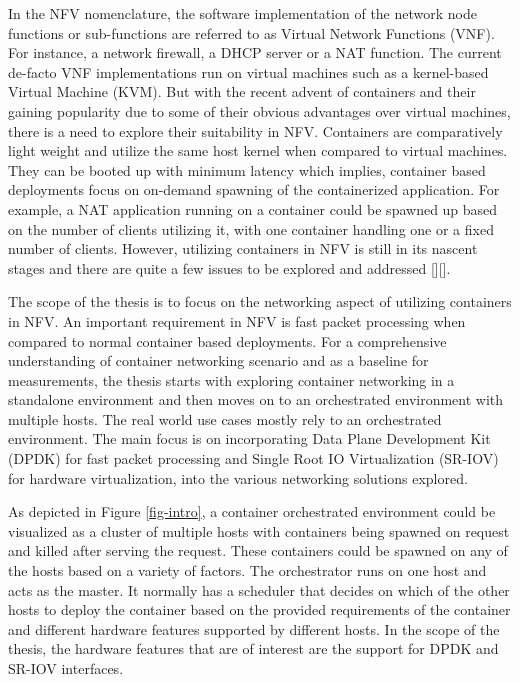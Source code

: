 \documentclass[english, 12pt, a4paper, elec, utf8, a-1b, online]{aaltothesis}
\begin{document}
In the NFV nomenclature, the software implementation of the network node functions or sub-functions are referred to as Virtual Network Functions (VNF). For instance, a network firewall, a DHCP server or a NAT function. The current de-facto VNF implementations run on virtual machines such as a kernel-based Virtual Machine (KVM). But with the recent advent of containers and their gaining popularity due to some of their obvious advantages over virtual machines, there is a need to explore their suitability in NFV. Containers are comparatively light weight and utilize the same host kernel when compared to virtual machines. They can be booted up with minimum latency\cite{container-vm-comparison} which implies, container based deployments focus on on-demand spawning of the containerized application. For example, a NAT application running on a container could be spawned up based on the number of clients utilizing it, with one container handling one or a fixed number of clients. However, utilizing containers in NFV is still in its nascent stages and there are quite a few issues to be explored and addressed [][].

The scope of the thesis is to focus on the networking aspect of utilizing containers in NFV. An important requirement in NFV is fast packet processing when compared to normal container based deployments. For a comprehensive understanding of container networking scenario and as a baseline for measurements, the thesis starts with exploring container networking in a standalone environment and then moves on to an orchestrated environment with multiple hosts. The real world use cases mostly rely to an orchestrated environment. The main focus is on incorporating Data Plane Development Kit (DPDK) for fast packet processing and Single Root IO Virtualization (SR-IOV) for hardware virtualization, into the various networking solutions explored.

As depicted in Figure \ref{fig-intro}, a container orchestrated environment could be visualized as a cluster of multiple hosts with containers being spawned on request and killed after serving the request. These containers could be spawned on any of the hosts based on a variety of factors. The orchestrator runs on one host and acts as the master. It normally has a scheduler that decides on which of the other hosts to deploy the container based on the provided requirements of the container and different hardware features supported by different hosts. In the scope of the thesis, the hardware features that are of interest are the support for DPDK and SR-IOV interfaces. 
\end{document}
